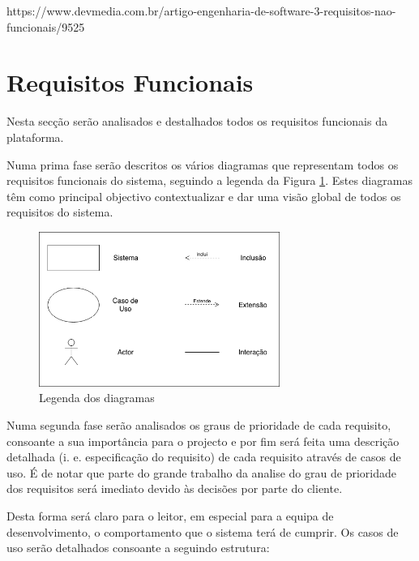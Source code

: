 https://www.devmedia.com.br/artigo-engenharia-de-software-3-requisitos-nao-funcionais/9525

\section{Requisitos Funcionais}
\label{rf}

Nesta secção serão analisados e destalhados todos os requisitos funcionais da plataforma.

Numa prima fase serão descritos os vários diagramas que representam todos os requisitos funcionais do sistema, seguindo a legenda da Figura \ref{fig:rf-legenda}. Estes diagramas têm como principal objectivo contextualizar e dar uma visão global de todos os requisitos do sistema. 

\begin{figure}[ht!]
	\begin{center}
		\includegraphics[width=0.7\textwidth]{img/rf/legenda}
		\caption{Legenda dos diagramas}
		\label{fig:rf-legenda}
	\end{center}
\end{figure}

Numa segunda fase serão analisados os graus de prioridade de cada requisito, consoante a sua importância para o projecto e por fim será feita uma descrição detalhada (i. e. especificação do requisito) de cada requisito através de casos de uso. É de notar que parte do grande trabalho da analise do grau de prioridade dos requisitos será imediato devido às decisões por parte do cliente.

Desta forma será claro para o leitor, em especial para a equipa de desenvolvimento, o comportamento que o sistema terá de cumprir. Os casos de uso serão detalhados consoante a seguindo estrutura:

